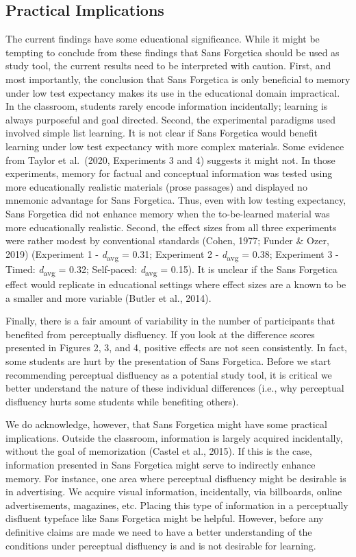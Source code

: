 \documentclass[
  english,
  jou]{apa7}
\begin{document}
\hypertarget{practical-implications}{%
\subsection{Practical Implications}\label{practical-implications}}

The current findings have some educational significance. While it might be tempting to conclude from these findings that Sans Forgetica should be used as study tool, the current results need to be interpreted with caution. First, and most importantly, the conclusion that Sans Forgetica is only beneficial to memory under low test expectancy makes its use in the educational domain impractical. In the classroom, students rarely encode information incidentally; learning is always purposeful and goal directed. Second, the experimental paradigms used involved simple list learning. It is not clear if Sans Forgetica would benefit learning under low test expectancy with more complex materials. Some evidence from Taylor et al.~(2020, Experiments 3 and 4) suggests it might not. In those experiments, memory for factual and conceptual information was tested using more educationally realistic materials (prose passages) and displayed no mnemonic advantage for Sans Forgetica. Thus, even with low testing expectancy, Sans Forgetica did not enhance memory when the to-be-learned material was more educationally realistic.
Second, the effect sizes from all three experiments were rather modest by conventional standards (Cohen, 1977; Funder \& Ozer, 2019) (Experiment 1 - \emph{d}\textsubscript{avg} = 0.31; Experiment 2 - \emph{d}\textsubscript{avg} = 0.38; Experiment 3 - Timed: \emph{d}\textsubscript{avg} = 0.32; Self-paced: \emph{d}\textsubscript{avg} = 0.15). It is unclear if the Sans Forgetica effect would replicate in educational settings where effect sizes are a known to be a smaller and more variable (Butler et al., 2014).

Finally, there is a fair amount of variability in the number of participants that benefited from perceptually disfluency. If you look at the difference scores presented in Figures 2, 3, and 4, positive effects are not seen consistently. In fact, some students are hurt by the presentation of Sans Forgetica. Before we start recommending perceptual disfluency as a potential study tool, it is critical we better understand the nature of these individual differences (i.e., why perceptual disfluency hurts some students while benefiting others).

We do acknowledge, however, that Sans Forgetica might have some practical implications. Outside the classroom, information is largely acquired incidentally, without the goal of memorization (Castel et al., 2015). If this is the case, information presented in Sans Forgetica might serve to indirectly enhance memory. For instance, one area where perceptual disfluency might be desirable is in advertising. We acquire visual information, incidentally, via billboards, online advertisements, magazines, etc. Placing this type of information in a perceptually disfluent typeface like Sans Forgetica might be helpful. However, before any definitive claims are made we need to have a better understanding of the conditions under perceptual disfluency is and is not desirable for learning.
\end{document}
